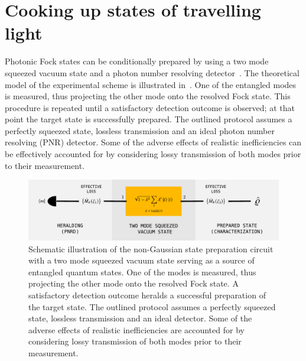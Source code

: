 \documentclass{article}
\begin{document}
%
%

\section{Cooking up states of travelling light}

Photonic Fock states can be conditionally prepared by using a two mode squeezed vacuum state and a photon number resolving detector~\cite{yukawa2013a,yoshikawa2018,tiedau2019,provaznik2020}. The theoretical model of the experimental scheme is illustrated in~. One of the entangled modes is measured, thus projecting the other mode onto the resolved Fock state. This procedure is repeated until a satisfactory detection outcome is observed; at that point the target state is successfully prepared. The outlined protocol assumes a perfectly squeezed state, lossless transmission and an ideal photon number resolving (PNR) detector. Some of the adverse effects of realistic inefficiencies can be effectively accounted for by considering lossy transmission of both modes prior to their measurement.

\begin{figure}[h]
  \begin{center}
    \includegraphics[width = 1.00 \columnwidth]{import/illustrate_scheme_alt.pdf}
  \end{center}
  \caption{
    Schematic illustration of the non-Gaussian state preparation circuit with a two mode squeezed vacuum state serving as a source of entangled quantum states. One of the modes is measured, thus projecting the other mode onto the resolved Fock state. A satisfactory detection outcome heralds a successful preparation of the target state. The outlined protocol assumes a perfectly squeezed state, lossless transmission and an ideal detector. Some of the adverse effects of realistic inefficiencies are accounted for by considering lossy transmission of both modes prior to their measurement.
  }
  \label{f-scheme}
\end{figure}
\end{document}
